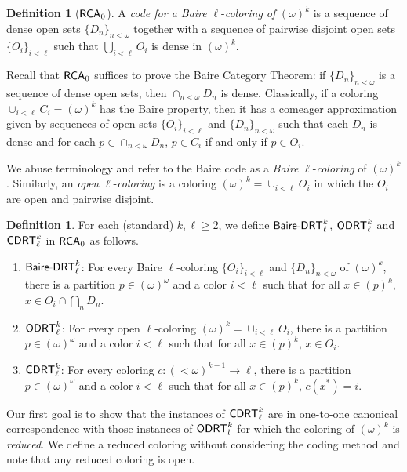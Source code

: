 \documentclass{amsart}
\theoremstyle{definition}
\newtheorem{defn}[thm]{Definition}
\theoremstyle{remark}
\newcommand{\system}[1]{\mbox{\fontfamily{cmss}\fontshape{n}\fontseries{m}%
    \selectfont#1}}
\newcommand{\RCA}{\system{RCA}\ensuremath{_0}}
\newcommand{\BaDRT}{\system{Baire-DRT}}
\newcommand{\cDRT}{\system{CDRT}}
\newcommand{\ODRT}{\system{ODRT}}
\begin{document}
\begin{defn}[$\RCA$]
\label{defn:Baire}
A \textit{code for a Baire} $\ell$-\textit{coloring of} $(\omega)^k$ is a sequence of dense open sets $\{D_n\}_{n<\omega}$ together 
with a sequence of pairwise disjoint
open sets $\{O_i\}_{i<\ell}$ such that $\bigcup_{i < \ell} O_i$ 
is dense in $(\omega)^k$. 
\end{defn}

Recall that $\RCA$ suffices to prove the Baire Category Theorem: if $\{ D_n \}_{n < \omega}$ is a sequence of dense open sets, then $\cap_{n < \omega} D_n$ is dense. 
Classically, if a coloring $\cup_{i<\ell} C_i = (\omega)^k$ has the Baire property, then it has a comeager  
approximation given by sequences of open sets $\{O_i\}_{i<\ell}$ and $\{D_n\}_{n<\omega}$ such that 
each $D_n$ is dense and for each $p \in \cap_{n<\omega} D_n$, $p \in C_i$ if and only if $p \in O_i$. 

We abuse terminology and refer to the Baire code as a \textit{Baire} $\ell$-\textit{coloring} of $(\omega)^k$. 
Similarly, an \textit{open} $\ell$-\textit{coloring} 
is a coloring $(\omega)^k = \cup_{i < \ell} O_i$ in which the $O_i$ are open
 and pairwise disjoint.
\begin{defn}\label{def:2.1}
For each (standard) $k, \ell \geq 2$, we define $\BaDRT^k_{\ell}$, $\ODRT^k_{\ell}$ and $\cDRT^k_{\ell}$ in $\RCA$ as follows.
\begin{enumerate}
\item $\BaDRT^k_\ell$: For every Baire $\ell$-coloring $\{O_i\}_{i<\ell}$ and $\{D_n\}_{n<\omega}$ of $(\omega)^k$, there is a partition $p \in
  (\omega)^\omega$ and a color $i < \ell$ such that for all $x \in (p)^k$, $x
  \in O_i \cap \bigcap_n D_n$.
\item $\ODRT^k_\ell$: For every open $\ell$-coloring $(\omega)^k = \cup_{i<\ell} O_i$, there is a partition $p \in (\omega)^\omega$ and
  a color $i < \ell$ such that for all $x \in (p)^k$, $x \in O_i$.
\item $\cDRT^k_\ell$: For every coloring $c:(<\omega)^{k-1}\rightarrow \ell$, there is a partition $p \in (\omega)^\omega$
  and a color $i < \ell$ such that for all $x \in (p)^k$, $c(x^\ast) = i$.
\end{enumerate}
\end{defn}

Our first goal is to show that the instances of $\cDRT^k_\ell$ are in one-to-one canonical correspondence with those instances of
$\ODRT^k_l$ for which the coloring of $(\omega)^k$ is \emph{reduced}. We define a reduced coloring without considering the coding method 
and note that any reduced coloring is open. 
\end{document}
